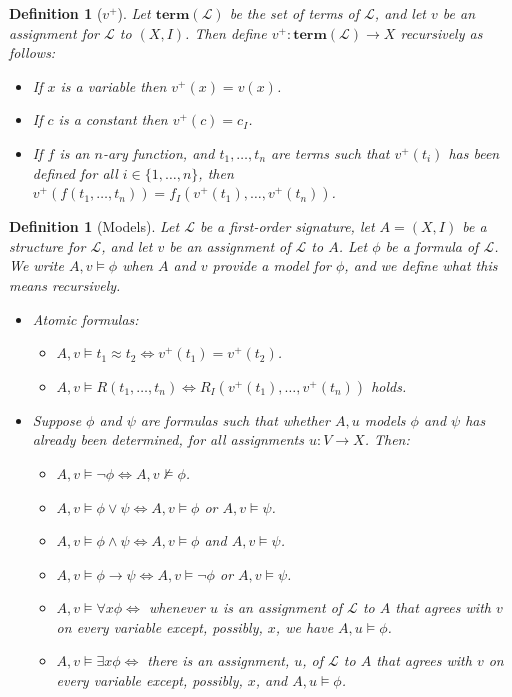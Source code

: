 \documentclass{article}
\theoremstyle{plain}
\newtheorem{definition}[theorem]{Definition}{\bfseries}{\upshape}
\newcommand{\sL}{\mathscr{L}}
\newcommand{\trm}{\mathbf{term}}
\begin{document}
\begin{definition}[$v^+$]
Let $\trm(\sL)$ be the set of terms of $\sL$, and let $v$ be an assignment for $\sL$ to $(X,I)$. Then define $v^+:\trm(\sL)\to X$ recursively as follows:
\begin{itemize}
\item If $x$ is a variable then $v^+(x)=v(x)$.
\item If $c$ is a constant then $v^+(c)= c_I$.
\item If $f$ is an $n$-ary function, and $t_1,\ldots,t_n$ are terms such that $v^+(t_i)$ has been defined for all $i\in\{1,\ldots,n\}$, then $v^+(f(t_1,\ldots,t_n))=f_I(v^+(t_1),\ldots,v^+(t_n))$.
\end{itemize}
\end{definition}


\begin{definition}[Models]
Let $\sL$ be a first-order signature, let $A=(X,I)$ be a structure for $\sL$, and let $v$ be an assignment of $\sL$ to $A$. Let $\phi$ be a formula of $\sL$. We write $A,v\models \phi$ when $A$ and $v$ provide a model for $\phi$, and we define what this means recursively. 
\begin{itemize}
\item Atomic formulas:
\begin{itemize}
\item $A,v\models t_1\approx t_2 \iff v^+(t_1)= v^+(t_2)$.
\item $A,v\models R(t_1,\ldots,t_n)\iff R_I(v^+(t_1),\ldots,v^+(t_n))$ holds.
\end{itemize}
\item Suppose $\phi$ and $\psi$ are formulas such that whether $A,u$ models $\phi$ and $\psi$ has already been determined, for all assignments $u: V\to X$. Then:
\begin{itemize}
\item $A,v\models \neg \phi \iff A,v\not\models \phi$.
\item $A,v\models \phi\vee \psi \iff A,v\models \phi$ or $A,v\models  \psi$.
\item $A,v\models \phi\wedge \psi \iff A,v\models \phi$ and $A,v\models \psi$.
\item $A,v\models \phi\rightarrow \psi \iff A,v\models \neg \phi$ or $A,v\models \psi$.
\item $A,v\models \forall x \phi\iff$ whenever $u$ is an assignment of $\sL$ to $A$ that agrees with $v$ on every variable except, possibly, $x$, we have $A,u\models \phi$.
\item $A,v\models \exists x \phi \iff$ there is an assignment, $u$, of $\sL$ to $A$ that agrees with $v$ on every variable except, possibly, $x$, and $A,u\models \phi$. 
\end{itemize}
\end{itemize}
\end{definition}
\end{document}
